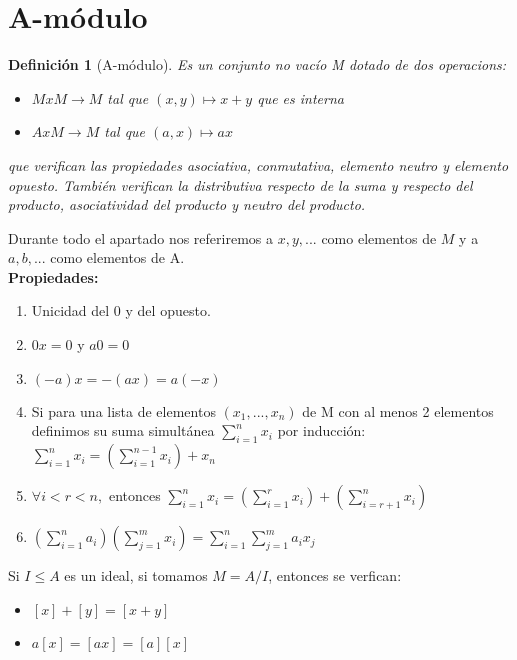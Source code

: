 \documentclass[11pt, a4paper, titlepage]{article}
\newif\IfInSansMode
\theoremstyle{theorem-style}
\theoremstyle{definition-style}
\newtheorem{ndef}{Definición}[section]
\theoremstyle{remark-style}
\theoremstyle{example-style}
\newenvironment{nlist}
{\begin{enumerate}
\renewcommand\labelenumi{(\emph{\roman{enumi})}}}
{\end{enumerate}}
\begin{document}
\section{A-módulo}
\begin{ndef}[A-módulo]
	Es un conjunto no vacío M dotado de dos operacions:
	\begin{itemize}
	\item $MxM \to M$ tal que $(x,y) \mapsto x+y$ que es interna
	\item $Ax M \to M$ tal que $(a,x) \mapsto ax$
\end{itemize}
que verifican las propiedades asociativa, conmutativa, elemento neutro y elemento opuesto. También verifican la distributiva respecto de la suma y respecto del producto, asociatividad del producto y neutro del producto.

\end{ndef}
Durante todo el apartado nos referiremos a $x, y,...$ como elementos de $M$ y a $a, b, ...$ como elementos de A.\\
\textbf{Propiedades:}
\begin{nlist}
	\item Unicidad del 0 y del opuesto.
	\item $0x = 0$ y $a0 = 0$
	\item $(-a)x = -(ax) = a(-x)$
	\item Si para una lista de elementos $(x_1,...,x_n)$ de M con al menos 2 elementos definimos su suma simultánea $\sum_{i=1}^n x_i$ por inducción:$ \sum_{i=1}^n x_i = (\sum_{i=1}^{n-1}x_i) +x_n$
	\item $\forall i < r < n,$ entonces $\sum_{i=1}^n x_i = (\sum_{i=1}^{r}x_i) + (\sum_{i=r+1}^{n}x_i) $
	\item $ (\sum_{i=1}^n a_i)(\sum_{j=1}^m x_i) = \sum_{i=1}^n \sum_{j=1}^m a_ix_j$
\end{nlist}

Si $I \leq A$ es un ideal, si tomamos $M= A/I$, entonces se verfican:
\begin{itemize}
	\item $[x]+[y] = [x+y]$
	\item $a[x] = [ax] = [a][x]$
\end{itemize}
\end{document}
